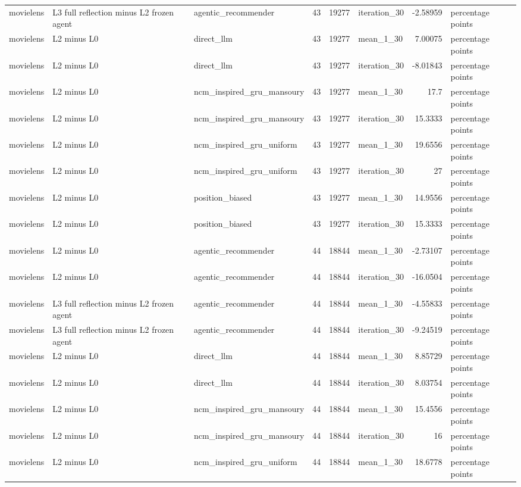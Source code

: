 \begin{table}[htbp!]
\begin{tabular}{lllrrlrl}
movielens & L3 full reflection minus L2 frozen agent & agentic\_recommender & 43 & 19277 & iteration\_30 & -2.58959 & percentage points \\
movielens & L2 minus L0 & direct\_llm & 43 & 19277 & mean\_1\_30 & 7.00075 & percentage points \\
movielens & L2 minus L0 & direct\_llm & 43 & 19277 & iteration\_30 & -8.01843 & percentage points \\
movielens & L2 minus L0 & ncm\_inspired\_gru\_mansoury & 43 & 19277 & mean\_1\_30 & 17.7 & percentage points \\
movielens & L2 minus L0 & ncm\_inspired\_gru\_mansoury & 43 & 19277 & iteration\_30 & 15.3333 & percentage points \\
movielens & L2 minus L0 & ncm\_inspired\_gru\_uniform & 43 & 19277 & mean\_1\_30 & 19.6556 & percentage points \\
movielens & L2 minus L0 & ncm\_inspired\_gru\_uniform & 43 & 19277 & iteration\_30 & 27 & percentage points \\
movielens & L2 minus L0 & position\_biased & 43 & 19277 & mean\_1\_30 & 14.9556 & percentage points \\
movielens & L2 minus L0 & position\_biased & 43 & 19277 & iteration\_30 & 15.3333 & percentage points \\
movielens & L2 minus L0 & agentic\_recommender & 44 & 18844 & mean\_1\_30 & -2.73107 & percentage points \\
movielens & L2 minus L0 & agentic\_recommender & 44 & 18844 & iteration\_30 & -16.0504 & percentage points \\
movielens & L3 full reflection minus L2 frozen agent & agentic\_recommender & 44 & 18844 & mean\_1\_30 & -4.55833 & percentage points \\
movielens & L3 full reflection minus L2 frozen agent & agentic\_recommender & 44 & 18844 & iteration\_30 & -9.24519 & percentage points \\
movielens & L2 minus L0 & direct\_llm & 44 & 18844 & mean\_1\_30 & 8.85729 & percentage points \\
movielens & L2 minus L0 & direct\_llm & 44 & 18844 & iteration\_30 & 8.03754 & percentage points \\
movielens & L2 minus L0 & ncm\_inspired\_gru\_mansoury & 44 & 18844 & mean\_1\_30 & 15.4556 & percentage points \\
movielens & L2 minus L0 & ncm\_inspired\_gru\_mansoury & 44 & 18844 & iteration\_30 & 16 & percentage points \\
movielens & L2 minus L0 & ncm\_inspired\_gru\_uniform & 44 & 18844 & mean\_1\_30 & 18.6778 & percentage points \\

\end{tabular}
\end{table}
